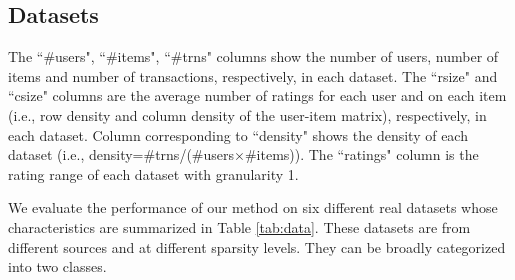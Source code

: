 \documentclass[letterpaper]{article}
\begin{document}
\subsection{Datasets}
\begin{table}[ht]
\caption{The datasets used in evaluation}
\label{tab:data}
\begin{center}
\tiny
   \begin{tablenotes}
      \tiny
      \item The ``\#users", ``\#items", ``\#trns" columns show the number of users, number of items and number of transactions, respectively, in each dataset. The ``rsize" and ``csize" columns are the average number of ratings for each user and on each item (i.e., row density and column density of the user-item matrix), respectively, in each dataset. Column corresponding to ``density" shows the density of each dataset (i.e., density=\#trns/(\#users$\times$\#items)). The ``ratings" column is the rating range of each dataset with granularity 1. 
    \end{tablenotes}
\end{center}
\end{table}
We evaluate the performance of our method on six different real datasets whose characteristics are summarized in Table \ref{tab:data}. These datasets are from different sources and at different sparsity levels. They can be broadly categorized into two classes.
\end{document}
